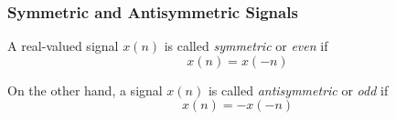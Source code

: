 \subsubsection{Symmetric and Antisymmetric Signals}\label{subsubsec:Symmetric and Antisymmetric Signals}
A real-valued signal $x(n)$ is called \emph{symmetric} or \emph{even} if
\begin{equation}\label{eq:Symmetric Signal}
  x(n) = x(-n)
\end{equation}

On the other hand, a signal $x(n)$ is called \emph{antisymmetric} or \emph{odd} if
\begin{equation}\label{eq:Asymmetric Signal}
  x(n) = -x(-n)
\end{equation}

